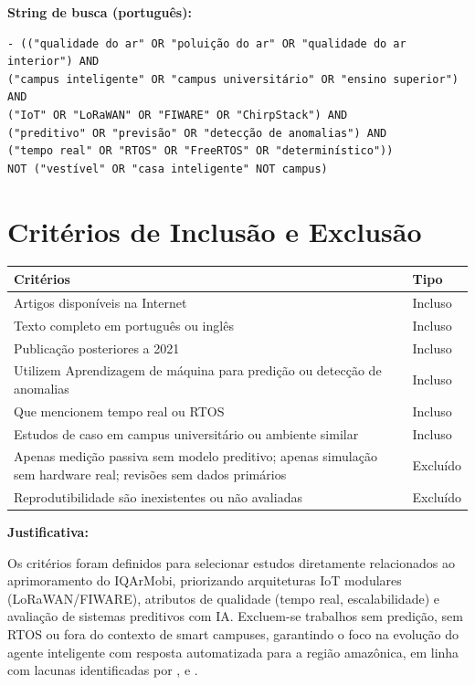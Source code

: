 \documentclass[12pt,a4paper]{article}
\begin{document}
\vspace{0.3cm}
\noindent \textbf{String de busca (português):}
\begin{verbatim}
- (("qualidade do ar" OR "poluição do ar" OR "qualidade do ar interior") AND
("campus inteligente" OR "campus universitário" OR "ensino superior") AND
("IoT" OR "LoRaWAN" OR "FIWARE" OR "ChirpStack") AND
("preditivo" OR "previsão" OR "detecção de anomalias") AND
("tempo real" OR "RTOS" OR "FreeRTOS" OR "determinístico"))
NOT ("vestível" OR "casa inteligente" NOT campus)
\end{verbatim}



\newpage
\section*{Critérios de Inclusão e Exclusão}

\begin{table}[ht]
\centering
\begin{tabular}{|p{10cm}|p{5cm}|}
\hline
\textbf{Critérios} & \textbf{Tipo} \\
\hline
Artigos disponíveis na Internet
& Incluso\\
\hline
Texto completo em português ou inglês
& Incluso\\
\hline
Publicação posteriores a 2021
& Incluso\\
\hline
Utilizem Aprendizagem de máquina para predição ou detecção de anomalias
& Incluso\\
\hline
Que mencionem tempo real ou RTOS
& Incluso\\
\hline
Estudos de caso em campus universitário ou ambiente similar
& Incluso\\
\hline
Apenas medição passiva sem modelo preditivo; apenas simulação sem hardware real; revisões sem dados primários
& Excluído\\
\hline
Reprodutibilidade são inexistentes ou não avaliadas
& Excluído\\
\hline

\end{tabular}
\end{table}

\noindent \textbf{Justificativa:}

Os critérios foram definidos para selecionar estudos diretamente
relacionados ao aprimoramento do IQArMobi, priorizando arquiteturas
IoT modulares (LoRaWAN/FIWARE), atributos de qualidade
(tempo real, escalabilidade) e avaliação de sistemas preditivos
com IA. Excluem-se trabalhos sem predição, sem RTOS ou fora do
contexto de smart campuses, garantindo o foco na evolução do agente inteligente com resposta automatizada para a 
região amazônica, em linha com lacunas identificadas por \textcite{mokrani2019}, \textcite{wang2023} e \textcite{benammar2018}.
\end{document}
